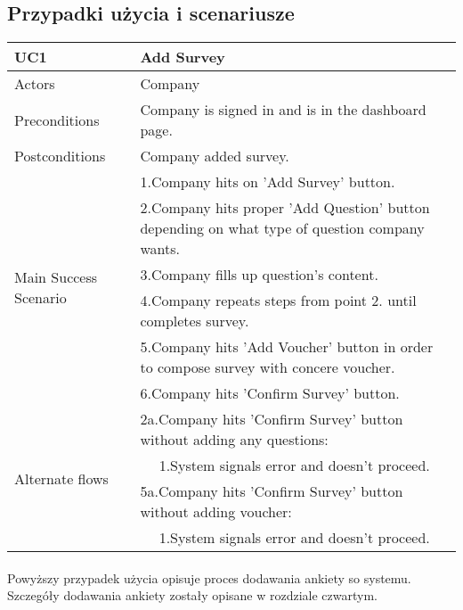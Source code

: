 \subsection{Przypadki użycia i scenariusze}
\begin{table}[H]
	\centering
	\sffamily\captionsetup{justification=raggedright,singlelinecheck=false,position = below, font = sf}
	\begin{tabular}{|m{3.5cm}|m{11cm}|}
	\hline 
	UC1 & Add Survey \\
	\hline
	Actors & Company \\ 
	\hline
	Preconditions & Company is signed in and is in the dashboard page. \\
	\hline
	Postconditions & Company added survey. \\
	\multirow{6}{*}{Main Success Scenario} & 1.Company hits on 'Add Survey' button. \\
	\cline{2-2}
	& 2.Company hits proper 'Add Question' button depending on what type of question company wants. \\
	\cline{2-2}
	& 3.Company fills up question's content. \\
	\cline{2-2}
	& 4.Company repeats steps from point 2. until completes survey. \\
	\cline{2-2}
	& 5.Company hits 'Add Voucher' button in order to compose survey with concere voucher. \\
	\cline{2-2}
	& 6.Company hits 'Confirm Survey' button. \\
	\hline
	\multirow{4}{*}{Alternate flows} & 2a.Company hits 'Confirm Survey' button without adding any questions: \\
	\cline{2-2}
	& \multicolumn{1}{c|}{1.System signals error and doesn't proceed.} \\
	\cline{2-2}
	& 5a.Company hits 'Confirm Survey' button without adding voucher: \\
	\cline{2-2}
	& \multicolumn{1}{c|}{1.System signals error and doesn't proceed.} \\
	\hline	
	\end{tabular}
\end{table}		

\paragraph{}
Powyższy przypadek użycia opisuje proces dodawania ankiety so systemu. Szczegóły dodawania ankiety zostały opisane w rozdziale czwartym.
		
